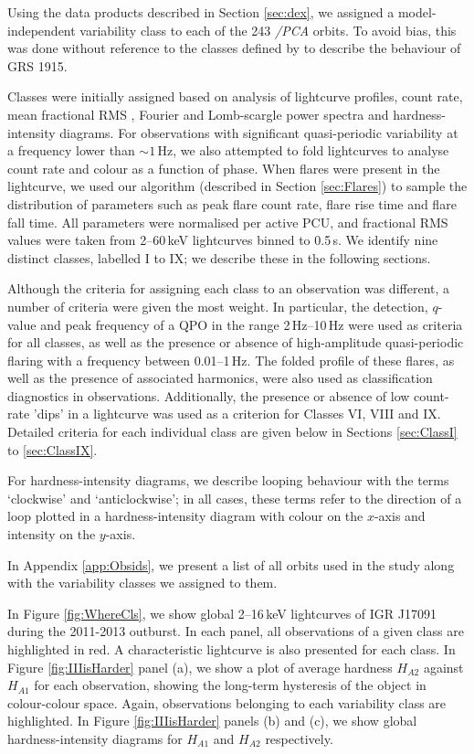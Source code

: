 \par Using the data products described in Section \ref{sec:dex}, we assigned a model-independent variability class to each of the 243 \rxte\textit{/PCA} orbits.  To avoid bias, this was done without reference to the classes defined by \citet{Belloni_GRS_MI} to describe the behaviour of GRS 1915.
\par Classes were initially assigned based on analysis of lightcurve profiles, count rate, mean fractional RMS \citep{Vaughan_RMS}, Fourier and Lomb-scargle power spectra and hardness-intensity diagrams.  For observations with significant quasi-periodic variability at a frequency lower than $\sim1$\,Hz, we also attempted to fold lightcurves to analyse count rate and colour as a function of phase.  When flares were present in the lightcurve, we used our algorithm (described in Section \ref{sec:Flares}) to sample the distribution of parameters such as peak flare count rate, flare rise time and flare fall time.  All parameters were normalised per active PCU, and fractional RMS values were taken from 2--60\,keV lightcurves binned to 0.5\,s.  We identify nine distinct classes, labelled I to IX; we describe these in the following sections.
\par Although the criteria for assigning each class to an observation was different, a number of criteria were given the most weight.  In particular, the detection, $q$-value and peak frequency of a QPO in the range 2\,Hz--10\,Hz were used as criteria for all classes, as well as the presence or absence of high-amplitude quasi-periodic flaring with a frequency between 0.01--1\,Hz.  The folded profile of these flares, as well as the presence of associated harmonics, were also used as classification diagnostics in observations.  Additionally, the presence or absence of low count-rate 'dips' in a lightcurve was used as a criterion for Classes VI, VIII and IX.  Detailed criteria for each individual class are given below in Sections \ref{sec:ClassI} to \ref{sec:ClassIX}.
\par For hardness-intensity diagrams, we describe looping behaviour with the terms `clockwise' and `anticlockwise'; in all cases, these terms refer to the direction of a loop plotted in a hardness-intensity diagram with colour on the $x$-axis and intensity on the $y$-axis.
\par In Appendix \ref{app:Obsids}, we present a list of all orbits used in the study along with the variability classes we assigned to them.
\par In Figure \ref{fig:WhereCls}, we show global 2--16\,keV lightcurves of IGR J17091 during the 2011-2013 outburst.  In each panel, all observations of a given class are highlighted in red.  A characteristic lightcurve is also presented for each class.  In Figure \ref{fig:IIIisHarder} panel (a), we show a plot of average hardness $H_{A2}$ against $H_{A1}$ for each observation, showing the long-term hysteresis of the object in colour-colour space.  Again, observations belonging to each variability class are highlighted.  In Figure \ref{fig:IIIisHarder} panels (b) and (c), we show global hardness-intensity diagrams for $H_{A1}$ and $H_{A2}$ respectively.
